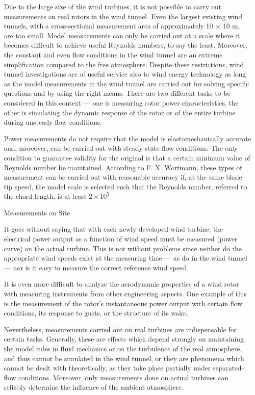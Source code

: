 
Due to the large size of the wind turbines, it is not possible to carry out measurements on real rotors in the wind tunnel. Even the largest existing wind tunnels, with a cross-sectional measurement area of approximately 10 × 10 m, are too small. Model measurements can only be carried out at a scale where it becomes difficult to achieve useful Reynolds numbers, to say the least. Moreover, the constant and even flow conditions in the wind tunnel are an extreme simplification compared to the free atmosphere. Despite these restrictions, wind tunnel investigations are of useful service also to wind energy technology as long as the model measurements in the wind tunnel are carried out for solving specific questions and by using the right means. There are two different tasks to be considered in this context — one is measuring rotor power characteristics, the other is simulating the dynamic response of the rotor or of the entire turbine during unsteady flow conditions.

Power measurements do not require that the model is elastomechanically accurate and, moreover, can be carried out with steady-state flow conditions. The only condition to guarantee validity for the original is that a certain minimum value of Reynolds number be maintained. According to F. X. Wortmann, these types of measurement can be carried out with reasonable accuracy if, at the same blade tip speed, the model scale is selected such that the Reynolds number, referred to the chord length, is at least $2 \times 10^5$

Measurements on Site

It goes without saying that with each newly developed wind turbine, the electrical power output as a function of wind speed must be measured (power curve) on the actual turbine. This is not without problems since neither do the appropriate wind speeds exist at the measuring time — as do in the wind tunnel — nor is it easy to measure the correct reference wind speed.

It is even more difficult to analyze the aerodynamic properties of a wind rotor with measuring instruments from other engineering aspects. One example of this is the measurement of the rotor’s instantaneous power output with certain flow conditions, its response to gusts, or the structure of its wake.

Nevertheless, measurements carried out on real turbines are indispensable for certain tasks. Generally, these are effects which depend strongly on maintaining the model rules in fluid mechanics or on the turbulence of the real atmosphere, and thus cannot be simulated
in the wind tunnel, or they are phenomena which cannot be dealt with theoretically, as
they take place partially under separated-flow conditions. Moreover, only measurements
done on actual turbines can reliably determine the influence of the ambient atmosphere.














